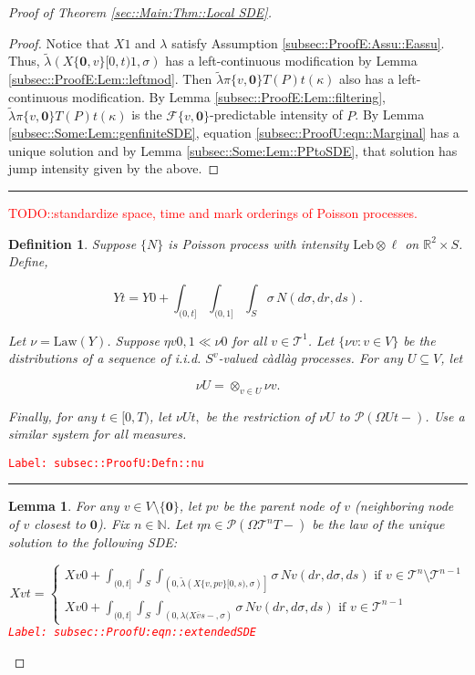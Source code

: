 \documentclass[12pt]{article}
\newcommand{\mb}{\mathbb}
\newcommand{\mc}{\mathcal}
\newcommand{\ov}{\overline}
\newcommand{\te}{\text}
\newcommand{\tr}{\textcolor{red}}
\newcommand{\labe}[1]{\tr{\texttt{Label: #1}}}
\newcommand{\lin}{\rule{\linewidth}{0.4 pt}}
\newcommand{\pmsr}{\mc{P}}							%
\renewcommand{\root}{\mathbf{0}}				%
\renewcommand{\v}{v}							%
\renewcommand{\U}{U}							%
\renewcommand{\S}{S}							%
\newcommand{\s}{\sigma}							%
\newcommand{\T}{T}								%
\renewcommand{\t}{t}							%
\newcommand{\proj}{\pi}							%
\renewcommand{\tt}{s}							%
\newcommand{\F}{\mc{F}}							%
\newcommand{\X}{X}								%
\newcommand{\cl}{\ov}							%
\newcommand{\tree}{\mc{T}}						%
\newcommand{\sln}[1]{^{#1}}						%
\newcommand{\poiss}{N}							%
\newcommand{\leb}{\te{Leb}}						%
\newcommand{\Sm}{\ell}							%
\newcommand{\rate}{\lambda}						%
\renewcommand{\r}{r}							%
\newcommand{\alt}[1]{\widetilde{#1}}			%
\newcommand{\mm}{\nu}							%
\newcommand{\mmm}{\eta}							%
\newcommand{\law}{\te{Law}}						%
\newcommand{\XX}{Y}								%
\renewcommand{\mark}{\kappa}					%
\newcommand{\rp}{P}								%
\newcommand{\crate}{\alt{\lambda}}				%
\newcommand{\p}{p}								%
\newtheorem{lem}[thms]{Lemma}
\newtheorem{defn}[thms]{Definition}
\begin{document}
\begin{proof}[Proof of Theorem \ref{sec::Main:Thm::Local SDE}]
\begin{proof}
Notice that \(\X{}{}{1}\) and \(\rate{}\) satisfy Assumption \ref{subsec::ProofE:Assu::Eassu}. Thus, \(\crate{}{}(\X{\{\root,\v\}}{[0,\t)}{1},\s)\) has a left-continuous modification by Lemma \ref{subsec::ProofE:Lem::leftmod}. Then \(\crate{\proj{\{\v,\root\}}{\T}(\rp{})}{\t}(\mark{})\) also has a left-continuous modification. By Lemma \ref{subsec::ProofE:Lem::filtering}, \(\crate{\proj{\{\v,\root\}}{\T}(\rp{})}{\t}(\kappa)\) is the \(\F{\{\v,\root\}}{}\)-predictable intensity of \(\rp{}\). By Lemma \ref{subsec::Some:Lem::genfiniteSDE}, equation \eqref{subsec::ProofU:eqn::Marginal} has a unique solution and by Lemma \ref{subsec::Some:Lem::PPtoSDE}, that solution has jump intensity given by the above.

\end{proof}

\lin

\tr{TODO::standardize space, time and mark orderings of Poisson processes.}

\begin{defn}
Suppose \(\{\poiss{}\}\) is Poisson process with intensity \(\leb\otimes \Sm\) on \(\mb{R}^2\times \S\). Define,

\[\XX{}{\t} = \XX{}{0} + \int_{(0,\t]}\int_{(0,1]}\int_\S\s\,\poiss{}(d\s,d\r,d\tt).\]

Let \(\mm{}{}{} = \law(\XX{}{})\). Suppose \(\mmm{\v}{0,}{1}\ll\mm{}{0}{}\) for all \(\v\in\tree\sln{1}\). Let \(\{\mm{\v}{}{}:\v\in V\}\) be the distributions of a sequence of i.i.d. \(\S^{\v}\)-valued c\`adl\`ag processes. For any \(\U\subseteq  V\), let 

\[\mm{\U}{}{} = \otimes_{\v\in\U} \mm{\v}{}{}.\]

Finally, for any \(\t\in [0,\T)\), let \(\mm{\U}{\t,}{}\) be the restriction of \(\mm{\U}{}{}\) to \(\pmsr(\Omega{\U}{\t-})\). Use a similar system for all measures.
\label{subsec::ProofU:Defn::nu}
\end{defn}
\labe{subsec::ProofU:Defn::nu}

\lin

\begin{lem}
For any \(\v \in  V\setminus\{\root\}\), let \(\p{\v}\) be the parent node of \(\v\) (neighboring node of \(\v\) closest to \(\root\)). Fix \(n \in \mb{N}\). Let \(\mmm{}{}{n} \in \pmsr\left(\Omega{\tree\sln{n}}{\T-}\right)\) be the law of the unique solution to the following SDE:

\begin{equation}
\X{\v}{\t} = \begin{cases}
\X{\v}{0} + \int_{(0,\t]}\int_\S\int_{\left(0,\crate{}{}(\X{\{\v,\p{\v}\}}{[0,\tt)},\s)\right]}\s\,\poiss{\v}(d\r,d\s,d\tt)\te{ if } \v \in \tree\sln{n}\setminus \tree\sln{n-1}\\
\X{\v}{0} + \int_{(0,\t]}\int_\S\int_{\left(0,\rate{}(\X{\cl{\v}}{\tt-},\s\right)}\s\,\poiss{\v}(d\r,d\s,d\tt)\te{ if } \v \in \tree\sln{n-1}
\end{cases}
\label{subsec::ProofU:eqn::extendedSDE}
\end{equation}
\labe{subsec::ProofU:eqn::extendedSDE}


\end{lem}
\end{proof}
\end{document}
